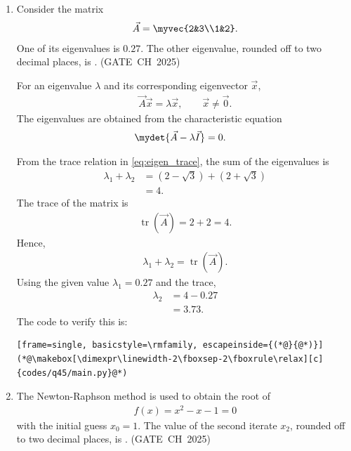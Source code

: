 \begin{enumerate}[label=\thesubsection.\arabic*, ref=\thesubsection.\theenumi,itemsep=0pt]
\item Consider the matrix
\begin{align}
\vec{A}=\myvec{2&3\\1&2}.
\end{align}
One of its eigenvalues is $0.27$. The other eigenvalue, rounded off to two decimal places, is \underline{\hspace{2cm}}. \hfill (GATE~CH~2025)

\solution For an eigenvalue $\lambda$ and its corresponding eigenvector $\vec{x}$,
\begin{align}
\vec{A}\vec{x}=\lambda\vec{x},\qquad \vec{x}\ne\vec{0}.
\end{align}
The eigenvalues are obtained from the characteristic equation
\begin{align}
\mydet{ \vec{A}-\lambda\vec{I}} &= 0.
\end{align}

From the trace relation in \eqref{eq:eigen_trace}, the sum of the eigenvalues is
\begin{align}
\lambda_1+\lambda_2&=(2-\sqrt{3})+(2+\sqrt{3})\\
&=4.
\end{align}
The trace of the matrix is
\begin{align}
\operatorname{tr}(\vec{A})=2+2=4.
\end{align}
Hence,
\begin{align}
\boxed{\lambda_1+\lambda_2=\operatorname{tr}(\vec{A})}.
\end{align}
Using the given value $\lambda_1=0.27$ and the trace,
\begin{align}
\lambda_2&=4-0.27\\
&=3.73.
\end{align}
The code to verify this is:
\begin{lstlisting}[frame=single, basicstyle=\rmfamily, escapeinside={(*@}{@*)}]
(*@\makebox[\dimexpr\linewidth-2\fboxsep-2\fboxrule\relax][c]{codes/q45/main.py}@*)
\end{lstlisting}

\item The Newton-Raphson method is used to obtain the root of
\begin{align}
f(x)=x^2-x-1=0
\end{align}
with the initial guess $x_{0}=1$. The value of the second iterate $x_{2}$, rounded off to two decimal places, is \underline{\hspace{2cm}}. \hfill (GATE~CH~2025)


\end{enumerate}
